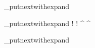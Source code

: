 \documentclass{article}
\begin{document}
\ExplSyntaxOn
\makeatletter

\debug_putnextwithexpand {
	\in@ {\foo} {\cslist}
} {
	\expandat \cslist
	\expandat \foo
}


\debug_putnextwithexpand {
} {
	\expandatlabel !
	\expandatlabel !
	\onlabel * \expandatlabel ^
	\onlabel * \expandatlabel ^
}

\debug_putnextwithexpand {
	\uppercase { \foo }
} {
	\after \uppercase \expandat \foo
}

\ExplSyntaxOff
\makeatother
\end{document}
